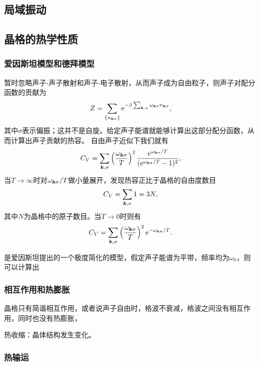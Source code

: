 \subsection{局域振动}

\subsection{晶格的热学性质}\label{sec:lattice-heat}

\subsubsection{爱因斯坦模型和德拜模型}

暂时忽略声子-声子散射和声子-电子散射，从而声子成为自由粒子，则声子对配分函数的贡献为
\begin{equation}
    Z = \sum_{\{n_{\vb*{k} \sigma}\}} \mathrm{e}^{-\beta \sum_{\vb*{k}, \sigma} \omega_{\vb*{k} \sigma} n_{\vb*{k} \sigma}},
\end{equation}
其中$\sigma$表示偏振；这并不是自旋。给定声子能谱就能够计算出这部分配分函数，从而计算出声子贡献的热容。
自由声子近似下我们就有
\[
    C_V = \sum_{\vb*{k}, \sigma} \left(\frac{\omega_{\vb*{k}\sigma}}{T}\right)^2 \frac{\mathrm{e}^{\omega_{\vb*{k}\sigma} / T}}{(\mathrm{e}^{\omega_{\vb*{k}\sigma} / T} - 1)^2},
\]
当$T \to \infty$时对$\omega_{\vb*{k} \sigma} / T$做小量展开，发现热容正比于晶格的自由度数目
\begin{equation}
    C_V = \sum_{\vb*{k}, \sigma} 1 = 3 N ,
\end{equation}
其中$N$为晶格中的原子数目。当$T \to 0$时则有
\begin{equation}
    C_V = \sum_{\vb*{k}, \sigma} \left(\frac{\omega_{\vb*{k}\sigma}}{T}\right)^2 \mathrm{e}^{-\omega_{\vb*{k}\sigma} / T}.
\end{equation}

是爱因斯坦提出的一个极度简化的模型，假定声子能谱为平带，频率均为$\omega_0$，则可以计算出


\subsubsection{相互作用和热膨胀}

晶格只有简谐相互作用，或者说声子自由时，格波不衰减，格波之间没有相互作用，同时也没有热膨胀，

热收缩：晶体结构发生变化。

\subsubsection{热输运}

